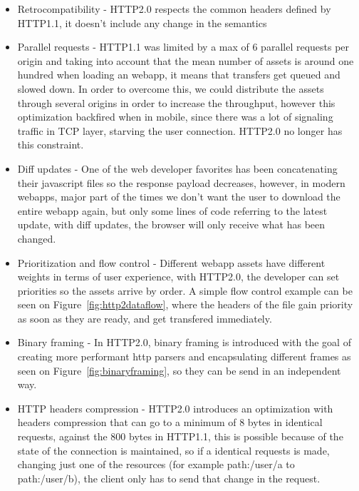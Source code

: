 \begin{itemize}
  \item Retrocompatibility - HTTP2.0 respects the common headers defined by HTTP1.1, it doesn't include any change in the semantics
  \item Parallel requests - HTTP1.1 was limited by a max of 6 parallel requests per origin and taking into account that the mean number of assets is around one hundred when loading an webapp, it means that transfers get queued and slowed down. In order to overcome this, we could distribute the assets through several origins in order to increase the throughput, however this optimization backfired when in mobile, since there was a lot of signaling traffic in TCP layer, starving the user connection. HTTP2.0 no longer has this constraint.
  \item Diff updates - One of the web developer favorites has been concatenating their javascript files so the response payload decreases, however, in modern webapps, major part of the times we don't want the user to download the entire webapp again, but only some lines of code referring to the latest update, with diff updates, the browser will only receive what has been changed.
  \item Prioritization and flow control - Different webapp assets have different weights in terms of user experience, with HTTP2.0, the developer can set priorities so the assets arrive by order.  A simple flow control example can be seen on Figure~\ref{fig:http2dataflow}, where the headers of the file gain priority as soon as they are ready, and get transfered immediately. 
  \item Binary framing - In HTTP2.0, binary framing is introduced with the goal of creating more performant http parsers and encapsulating different frames as seen on Figure~\ref{fig:binaryframing}, so they can be send in an independent way.
  \item HTTP headers compression - HTTP2.0 introduces an optimization with headers compression\cite{Ruellan2013} that can go to a minimum of 8 bytes in identical requests, against the 800 bytes in HTTP1.1, this is possible because of the state of the connection is maintained, so if a identical requests is made, changing just one of the resources (for example path:/user/a to path:/user/b), the client only has to send that change in the request.
\end{itemize}

